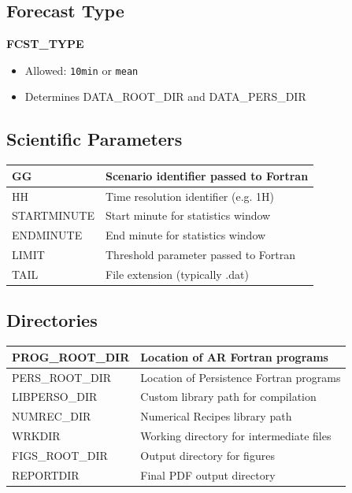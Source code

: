 \documentclass[a4paper,11pt]{article}
\begin{document}
\subsection{Forecast Type}

\textbf{FCST\_TYPE}

\begin{itemize}
    \item Allowed: \texttt{10min} or \texttt{mean}
    \item Determines DATA\_ROOT\_DIR and DATA\_PERS\_DIR
\end{itemize}

\subsection{Scientific Parameters}

\begin{longtable}{|p{4cm}|p{9cm}|}
\hline
GG & Scenario identifier passed to Fortran \\ \hline
HH & Time resolution identifier (e.g. 1H) \\ \hline
STARTMINUTE & Start minute for statistics window \\ \hline
ENDMINUTE & End minute for statistics window \\ \hline
LIMIT & Threshold parameter passed to Fortran \\ \hline
TAIL & File extension (typically .dat) \\ \hline
\end{longtable}

\subsection{Directories}

\begin{longtable}{|p{4cm}|p{9cm}|}
\hline
PROG\_ROOT\_DIR & Location of AR Fortran programs \\ \hline
PERS\_ROOT\_DIR & Location of Persistence Fortran programs \\ \hline
LIBPERSO\_DIR & Custom library path for compilation \\ \hline
NUMREC\_DIR & Numerical Recipes library path \\ \hline
WRKDIR & Working directory for intermediate files \\ \hline
FIGS\_ROOT\_DIR & Output directory for figures \\ \hline
REPORTDIR & Final PDF output directory \\ \hline
\end{longtable}
\end{document}
